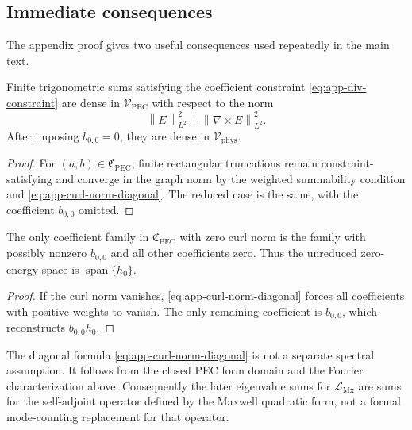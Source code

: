 \documentclass[11pt]{article}
\providecommand{\norm}[1]{\left\lVert #1\right\rVert}
\providecommand{\VPEC}{\mathcal V_{\mathrm{PEC}}}
\providecommand{\Vphys}{\mathcal V_{\mathrm{phys}}}
\providecommand{\hzero}{h_0}
\providecommand{\LMx}{\mathcal L_{\mathrm{Mx}}}
\numberwithin{equation}{section}
\begin{document}
\subsection{Immediate consequences}
\label{app:subsec:immediate-consequences}

The appendix proof gives two useful consequences used repeatedly in the main
text.

\begin{corollary}
\label{cor:app-density-finite-transverse-sums}
Finite trigonometric sums satisfying the coefficient constraint
\eqref{eq:app-div-constraint} are dense in \(\VPEC\) with respect to the norm
\[
    \norm{E}_{L^2}^2+\norm{\nabla\times E}_{L^2}^2 .
\]
After imposing \(b_{0,0}=0\), they are dense in \(\Vphys\).
\end{corollary}

\begin{proof}
For \((a,b)\in\mathfrak C_{\mathrm{PEC}}\), finite rectangular truncations remain
constraint-satisfying and converge in the graph norm by the weighted
summability condition and \eqref{eq:app-curl-norm-diagonal}.  The reduced case
is the same, with the coefficient \(b_{0,0}\) omitted.
\end{proof}

\begin{corollary}
\label{cor:app-zero-mode-coefficient-model}
The only coefficient family in \(\mathfrak C_{\mathrm{PEC}}\) with zero curl norm
is the family with possibly nonzero \(b_{0,0}\) and all other coefficients zero.
Thus the unreduced zero-energy space is \(\operatorname{span}\{\hzero\}\).
\end{corollary}

\begin{proof}
If the curl norm vanishes, \eqref{eq:app-curl-norm-diagonal} forces all
coefficients with positive weights to vanish.  The only remaining coefficient is
\(b_{0,0}\), which reconstructs \(b_{0,0}\hzero\).
\end{proof}

\begin{remark}
\label{rem:app-role-fourier-domain-lemma}
The diagonal formula \eqref{eq:app-curl-norm-diagonal} is not a separate spectral
assumption.  It follows from the closed PEC form domain and the Fourier
characterization above.  Consequently the later eigenvalue sums for \(\LMx\) are
sums for the self-adjoint operator defined by the Maxwell quadratic form, not a
formal mode-counting replacement for that operator.
\end{remark}
\end{document}
